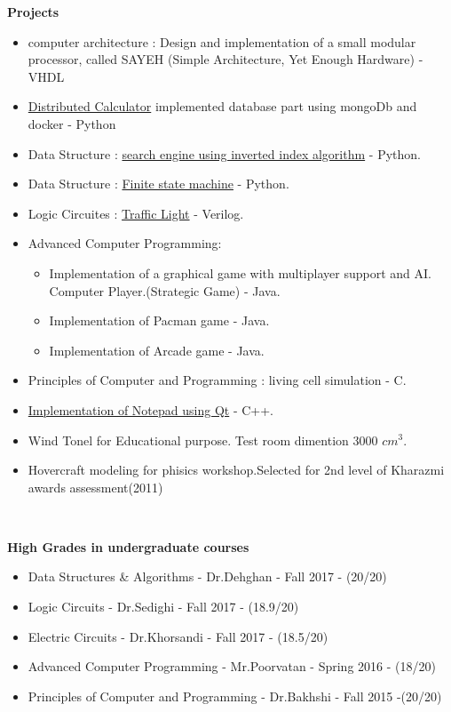\documentclass[a4paper,12pt,final]{memoir}
\newcommand{\Sep}{\vspace{1.5em}}
\newcommand{\SmallSep}{\vspace{0.5em}}
\newcommand{\CVSection}[1]
	{\Large\textbf{#1}\par
	\SmallSep\normalsize\normalfont}
\begin{document}
\Sep 

\CVSection{Projects}
\begin{itemize}
	\item computer architecture : Design and implementation of a small modular processor, called SAYEH (Simple Architecture, Yet Enough Hardware) - VHDL
	\item \href{https:://github.com/DistributedCalc/Database-2}{Distributed Calculator} implemented database part using mongoDb and docker - Python
	\item Data Structure : \href{https://github.com/mahtabfarrokh/SearchEngine}{search engine using inverted index algorithm} - Python.
	\item Data Structure : \href{https://github.com/mahtabfarrokh/Finite-state_machine}{Finite state machine} - Python.
	\item Logic Circuites : \href {https://github.com/mahtabfarrokh/Traffic_Light}{Traffic Light} - Verilog.
	\item Advanced Computer Programming:
		\begin{itemize}[$\circ$]
		\item  Implementation of a graphical game with multiplayer support and AI. Computer Player.(Strategic Game) - Java.
     	\item Implementation of Pacman game - Java.
	    \item Implementation of Arcade game - Java.
		\end{itemize}
		
	\item Principles of Computer and Programming : living cell simulation - C.
	\item \href {https://github.com/mahtabfarrokh/NotePad}{Implementation of Notepad using Qt} - C++.
	\item Wind Tonel for Educational purpose. Test room dimention 3000
$cm^{3}$.
	\item Hovercraft modeling for phisics workshop.Selected for 2nd level of Kharazmi awards assessment(2011)
 
\end{itemize}


\newpage
\normalsize\normalfont
\framebreak
\framebreak
\\

\Sep


\CVSection{High Grades in undergraduate courses}
	\begin{itemize}
		\item Data Structures \& Algorithms - Dr.Dehghan - Fall 2017 - (20/20)
		\item Logic Circuits - Dr.Sedighi - Fall 2017 - (18.9/20)
		\item Electric Circuits - Dr.Khorsandi - Fall 2017 - (18.5/20)	
		\item Advanced Computer Programming - Mr.Poorvatan - Spring 2016 - (18/20)
		\item Principles of Computer and Programming - Dr.Bakhshi - Fall 2015 -(20/20)
		
	\end{itemize}
\end{document}
